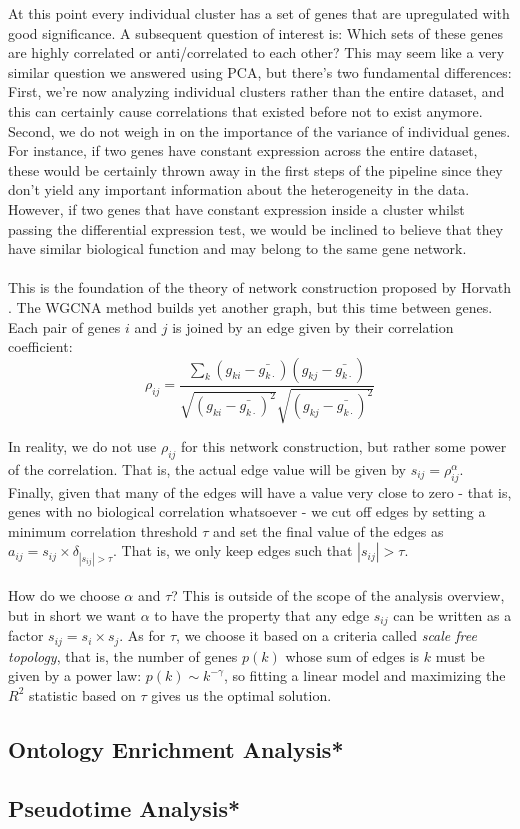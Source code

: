 At this point every individual cluster has a set of genes that are upregulated with good significance. A subsequent question of interest is: Which sets of these genes are highly correlated or anti/correlated to each other? This may seem like a very similar question we answered using PCA, but there's two fundamental differences: First, we're now analyzing individual clusters rather than the entire dataset, and this can certainly cause correlations that existed before not to exist anymore. Second, we do not weigh in on the importance of the variance of individual genes. For instance, if two genes have constant expression across the entire dataset, these would be certainly thrown away in the first steps of the pipeline since they don't yield any important information about the heterogeneity in the data. However, if two genes that have constant expression inside a cluster whilst passing the differential expression test, we would be inclined to believe that they have similar biological function and may belong to the same gene network.\\
\\
This is the foundation of the theory of network construction proposed by Horvath \cite{}. The WGCNA method builds yet another graph, but this time between genes. Each pair of genes $i$ and $j$ is joined by an edge given by their correlation coefficient:
$$
\rho_{ij} = \frac{\sum_{k} (g_{ki} - \bar{g_{k\cdot}})(g_{kj} - \bar{g_{k\cdot}})}	{\sqrt{(g_{ki} - \bar{g_{k\cdot}})^2}\sqrt{(g_{kj} - \bar{g_{k\cdot}})^2}}
$$

In reality, we do not use $\rho_{ij}$ for this network construction, but rather some power of the correlation. That is, the actual edge value will be given by $s_{ij} = \rho_{ij}^{\alpha}$. Finally, given that many of the edges will have a value very close to zero - that is, genes with no biological correlation whatsoever - we cut off edges by setting a minimum correlation threshold $\tau$ and set the final value of the edges as $a_{ij} = s_{ij} \times \delta_{|s_{ij}| > \tau}$. That is, we only keep edges such that $|s_{ij}| > \tau$. \\
\\
How do we choose $\alpha$ and $\tau$? This is outside of the scope of the analysis overview, but in short we want $\alpha$ to have the property that any edge $s_{ij}$ can be written as a factor $s_{ij} = s_i \times s_j$. As for $\tau$, we choose it based on a criteria called \emph{scale free topology}, that is, the number of genes $p(k)$ whose sum of edges is $k$ must be given by a power law: $p(k) \sim k^{-\gamma}$, so fitting a linear model and maximizing the $R^2$ statistic based on $\tau$ gives us the optimal solution. 

\subsection{Ontology Enrichment Analysis*}

\subsection{Pseudotime Analysis*}
\newpage



